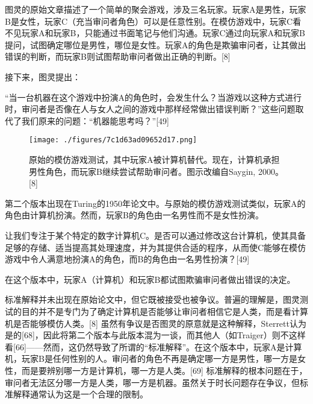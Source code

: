 图灵的原始文章描述了一个简单的聚会游戏，涉及三名玩家。玩家A是男性，玩家B是女性，玩家C（充当审问者角色）可以是任意性别。在模仿游戏中，玩家C看不见玩家A和玩家B，只能通过书面笔记与他们沟通。玩家C通过向玩家A和玩家B提问，试图确定哪位是男性，哪位是女性。玩家A的角色是欺骗审问者，让其做出错误的判断，而玩家B则试图帮助审问者做出正确的判断。[8]

接下来，图灵提出：

“当一台机器在这个游戏中扮演A的角色时，会发生什么？当游戏以这种方式进行时，审问者是否像在人与女人之间的游戏中那样经常做出错误判断？”这些问题取代了我们原来的问题：“机器能思考吗？”[49]
\begin{figure}[ht]
\centering
\texttt{[image: ./figures/7c1d63ad09652d17.png]}
\caption{原始的模仿游戏测试，其中玩家A被计算机替代。现在，计算机承担男性角色，而玩家B继续尝试帮助审问者。图示改编自Saygin, 2000。[8]} \label{fig_TLCS_3}
\end{figure}
第二个版本出现在Turing的1950年论文中。与原始的模仿游戏测试类似，玩家A的角色由计算机扮演。然而，玩家B的角色由一名男性而不是女性扮演。

让我们专注于某个特定的数字计算机C。是否可以通过修改这台计算机，使其具备足够的存储、适当提高其处理速度，并为其提供合适的程序，从而使C能够在模仿游戏中令人满意地扮演A的角色，而B的角色由一名男性扮演？[49]

在这个版本中，玩家A（计算机）和玩家B都试图欺骗审问者做出错误的决定。

标准解释并未出现在原始论文中，但它既被接受也被争议。普遍的理解是，图灵测试的目的并不是专门为了确定计算机是否能够让审问者相信它是人类，而是看计算机是否能够模仿人类。[8] 虽然有争议是否图灵的原意就是这种解释，Sterrett认为是的[68]，因此将第二个版本与此版本混为一谈，而其他人（如Traiger）则不这样看[66]——然而，这仍然导致了所谓的“标准解释”。在这个版本中，玩家A是计算机，玩家B是任何性别的人。审问者的角色不再是确定哪一方是男性，哪一方是女性，而是要辨别哪一方是计算机，哪一方是人类。[69] 标准解释的根本问题在于，审问者无法区分哪一方是人类，哪一方是机器。虽然关于时长问题存在争议，但标准解释通常认为这是一个合理的限制。